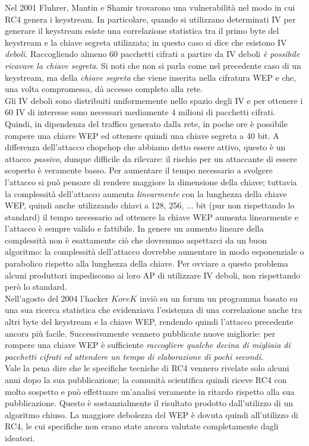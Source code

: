 Nel 2001 Fluhrer, Mantin e Shamir trovarono una vulnerabilità nel modo in cui RC4 genera i keystream. In particolare, quando si utilizzano determinati IV per generare il keystream esiste una correlazione statistica tra il primo byte del keystream e la chiave segreta utilizzata; in questo caso si dice che esistono IV \textit{deboli}. Raccogliendo almeno 60 pacchetti cifrati a partire da IV deboli \textit{è possibile ricavare la chiave segreta}. Si noti che non si parla come nel precedente caso di un keystream, ma della \textit{chiave segreta} che viene inserita nella cifratura WEP e che, una volta compromessa, dà accesso completo alla rete.\\
Gli IV deboli sono distribuiti uniformemente nello spazio degli IV e per ottenere i 60 IV di interesse sono necessari mediamente 4 milioni di pacchetti cifrati. Quindi, in dipendenza del traffico generato dalla rete, in poche ore è possibile rompere una chiave WEP ed ottenere quindi una chiave segreta a 40 bit. A differenza dell'attacco chopchop che abbiamo detto essere attivo, questo è un attacco \textit{passivo}, dunque difficile da rilevare: il rischio per un attaccante di essere scoperto è veramente basso. Per aumentare il tempo necessario a svolgere l'attacco si può pensare di rendere maggiore la dimensione della chiave; tuttavia la complessità dell'attacco aumenta \textit{linearmente} con la lunghezza della chiave WEP, quindi anche utilizzando chiavi a 128, 256, $\dots$ bit (pur non rispettando lo standard) il tempo necessario ad ottenere la chiave WEP aumenta linearmente e l'attacco è sempre valido e fattibile. In genere un aumento lineare della complessità non è esattamente ciò che dovremmo aspettarci da un buon algoritmo: la complessità dell'attacco dovrebbe aumentare in modo esponenziale o parabolico rispetto alla lunghezza della chiave. Per ovviare a questo problema alcuni produttori impediscono ai loro AP di utilizzare IV deboli, non rispettando però lo standard.\\
Nell'agosto del 2004 l'hacker $KoreK$ inviò su un forum un programma basato su una sua ricerca statistica che evidenziava l'esistenza di una correlazione anche tra altri byte del keystream e la chiave WEP, rendendo quindi l'attacco precedente ancora più facile. Successivamente vennero pubblicate nuove migliorie: per rompere una chiave WEP è sufficiente \textit{raccogliere qualche decina di migliaia di pacchetti cifrati ed attendere un tempo di elaborazione di pochi secondi}.\\
Vale la pena dire che le specifiche tecniche di RC4 vennero rivelate solo alcuni anni dopo la sua pubblicazione; la comunità scientifica quindi riceve RC4 con molto sospetto e può effettuare un'analisi veramente in ritardo rispetto alla sua pubblicazione. Questo è sostanzialmente il risultato prodotto dall'utilizzo di un algoritmo chiuso. La maggiore debolezza del WEP è dovuta quindi all'utilizzo di RC4, le cui specifiche non erano state ancora valutate completamente dagli ideatori.

